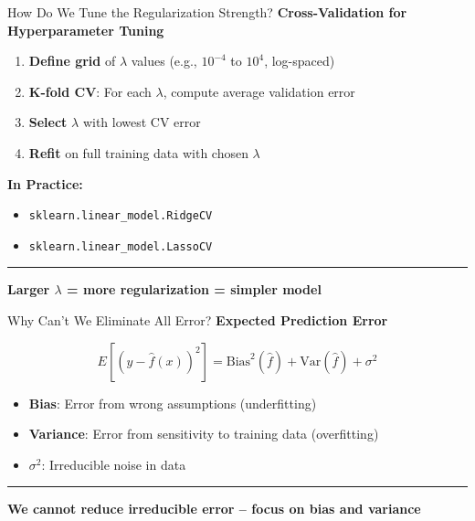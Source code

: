 \documentclass[8pt,aspectratio=169]{beamer}
\newcommand{\bottomnote}[1]{%
\vfill
\vspace{-2mm}
\textcolor{mllavender2}{\rule{\textwidth}{0.4pt}}
\vspace{1mm}
\footnotesize
\textbf{#1}
}
\begin{document}
\begin{frame}[t]{How Do We Tune the Regularization Strength?}
  \textbf{Cross-Validation for Hyperparameter Tuning}

  \begin{enumerate}
    \item \textbf{Define grid} of $\lambda$ values (e.g., $10^{-4}$ to $10^{4}$, log-spaced)
    \item \textbf{K-fold CV}: For each $\lambda$, compute average validation error
    \item \textbf{Select} $\lambda$ with lowest CV error
    \item \textbf{Refit} on full training data with chosen $\lambda$
  \end{enumerate}

  \vspace{0.5em}
  \textbf{In Practice:}
  \begin{itemize}
    \item \texttt{sklearn.linear\_model.RidgeCV}
    \item \texttt{sklearn.linear\_model.LassoCV}
  \end{itemize}

  \bottomnote{Larger $\lambda$ = more regularization = simpler model}
\end{frame}

\begin{frame}[t]{Why Can't We Eliminate All Error?}
  \textbf{Expected Prediction Error}

  \begin{equation}
    E[(y - \hat{f}(x))^2] = \text{Bias}^2(\hat{f}) + \text{Var}(\hat{f}) + \sigma^2
  \end{equation}

  \begin{itemize}
    \item \textbf{Bias}: Error from wrong assumptions (underfitting)
    \item \textbf{Variance}: Error from sensitivity to training data (overfitting)
    \item \textbf{$\sigma^2$}: Irreducible noise in data
  \end{itemize}

  \bottomnote{We cannot reduce irreducible error -- focus on bias and variance}
\end{frame}
\end{document}
